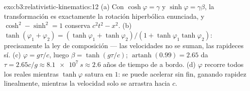 \begin{solution}{exo:b3:relativistic-kinematics:12}
(a) Con $\cosh\varphi = \gamma$ y $\sinh\varphi = \gamma\beta$, la
transformación es exactamente la rotación hiperbólica enunciada, y
$\cosh^2 - \sinh^2 = 1$ conserva $c^2t^2 - x^2$. (b)
$\tanh(\varphi_1 + \varphi_2) = (\tanh\varphi_1 + \tanh\varphi_2)/(1 +
\tanh\varphi_1\tanh\varphi_2)$: precisamente la ley de composición ---
las velocidades no se suman, las rapideces sí. (c) $\varphi = g\tau/c$, luego
$\beta = \tanh(g\tau/c)$; $\operatorname{artanh}(0.99) = 2.65$ da
$\tau = 2.65c/g \approx \qty{8.1e7}{s} \approx 2.6$ años de tiempo de a
bordo. (d) $\varphi$ recorre todos los reales mientras $\tanh\varphi$
satura en $1$: se puede acelerar sin fin, ganando rapidez
linealmente, mientras la velocidad solo se arrastra hacia $c$.
\end{solution}

